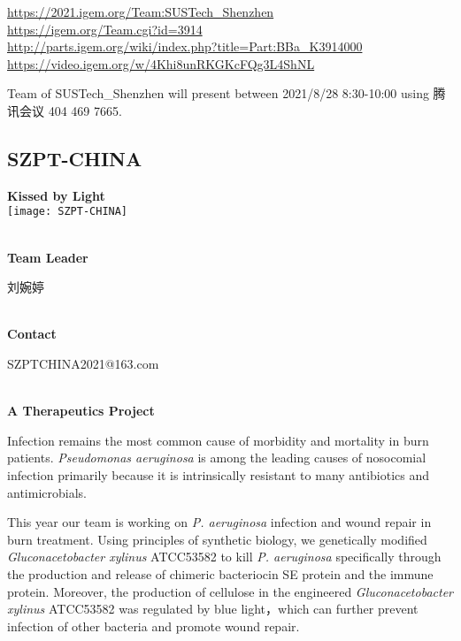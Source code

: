 \url{https://2021.igem.org/Team:SUSTech\_Shenzhen }\\
\url{https://igem.org/Team.cgi?id=3914 }\\
\url{http://parts.igem.org/wiki/index.php?title=Part:BBa_K3914000 }\\
\url{https://video.igem.org/w/4Khi8unRKGKcFQg3L4ShNL }\\

\vfill{}









Team of SUSTech\_Shenzhen will present between    2021/8/28 8:30-10:00     using 腾讯会议 404 469 7665.
\newpage


\subsection{\textcolor{Blu}{ SZPT-CHINA } }
\vspace{5mm}
\begin{center}
\large{
  \textbf{ Kissed by Light }\\

  \texttt{[image: SZPT-CHINA]}
}
\end{center}
\textbf{\\Team Leader}

  刘婉婷


\textbf{\\Contact}

  SZPTCHINA2021@163.com


\textbf{\\A Therapeutics Project\\}\begin{spacing}{1.5}

Infection remains the most common cause of morbidity and mortality in burn patients. \textit{Pseudomonas aeruginosa} is among the leading causes of nosocomial infection primarily because it is intrinsically resistant to many antibiotics and antimicrobials.

This year our team is working on \textit{P. aeruginosa} infection and wound repair in burn treatment. Using principles of synthetic biology, we genetically modified \textit{Gluconacetobacter xylinus} ATCC53582 to kill \textit{P. aeruginosa} specifically through the production and release of chimeric bacteriocin SE protein and the immune protein. Moreover, the production of cellulose in the engineered \textit{Gluconacetobacter xylinus} ATCC53582 was regulated by blue light，which can further prevent infection of other bacteria and promote wound repair.\end{spacing}
\\


